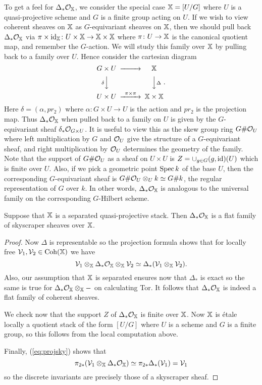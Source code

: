 \documentclass[12pt]{amsart}
\begin{document}
To get a feel for $\Delta_* \mathcal{O}_{\mathbb{X}}$, we consider the special case $\mathbb{X}= [U/G]$ where $U$ is a quasi-projective scheme and $G$ is a finite group acting on $U$. If we wish to view coherent sheaves on $\mathbb{X}$ as $G$-equivariant sheaves on $\mathbb{X}$, then we should pull back $\Delta_* \mathcal{O}_{\mathbb{X}}$ via $\pi \times \operatorname{id}_{\mathbb{X}} \colon U \times \mathbb{X} \to \mathbb{X} \times \mathbb{X}$ where $\pi \colon U \to \mathbb{X}$ is the canonical quotient map, and remember the $G$-action. We will study this family over $\mathbb{X}$ by pulling back to a family over $U$. Hence consider the cartesian diagram
$$\begin{CD}
G \times U @>>> \bX \\
@V{\delta}VV @VV{\Delta}V \\
U \times U @>{\pi \times \pi}>> \bX \times \bX 
\end{CD}.$$
Here $\delta = (\alpha, pr_2)$ where $\alpha \colon G \times U \to U$ is the action and $pr_2$ is the projection map. Thus $\Delta_*\mathcal{O}_{\mathbb{X}}$ when pulled 
back to a family on $U$ is given by the $G$-equivariant sheaf $\delta_* \mathcal{O}_{G \times U}$. It is useful to view this as the skew group ring $G \# \mathcal{O}_U$ where left multiplication by $G$ and $\mathcal{O}_U$ give the structure of a $G$-equivariant sheaf, and right multiplication by $\mathcal{O}_{U}$ determines the geometry of the family.  Note that the support of $G \# \mathcal{O}_U$ as a sheaf on $U \times U$ is $Z = \cup_{g \in G} (g,\operatorname{id})(U)$ which is finite over $U$. Also, if we pick a geometric point $\operatorname{Spec} k$ of the base $U$, then the corresponding $G$-equivariant sheaf is $G \# \mathcal{O}_U \otimes_U k \simeq G \# k$, the regular representation of $G$ over $k$.
In other words, $\Delta_* \mathcal{O}_{\mathbb{X}}$ is analogous to the universal family on the corresponding $G$-Hilbert scheme.


\begin{proposition} \label{prop:universalsky}
Suppose that $\mathbb{X}$ is a separated quasi-projective stack. Then $\Delta_* \mathcal{O}_{\mathbb{X}}$ is a flat family of skyscraper sheaves over $\mathbb{X}$. 
\end{proposition}
\begin{proof}
Now $\Delta$ is representable so the projection formula shows that for locally free $\mathcal{V}_1,\mathcal{V}_2 \in \operatorname{Coh}(\mathbb{X})$ we have
\begin{equation} \mathcal{V}_1 \otimes_{\mathbb{X}} \Delta_* \mathcal{O}_{\mathbb{X}} \otimes_{\mathbb{X}} \mathcal{V}_2 \simeq \Delta_*(\mathcal{V}_1 \otimes_{\mathbb{X}} \mathcal{V}_2) .
\label{eq:projsky}
\end{equation}
Also, our assumption that $\mathbb{X}$ is separated ensures now that $\Delta_*$ is exact so the same is true for $\Delta_* \mathcal{O}_{\mathbb{X}} \otimes_{\mathbb{X}} -$ on calculating Tor. It follows that $\Delta_* \mathcal{O}_{\mathbb{X}}$ is indeed a flat family of coherent sheaves. 

We check now that the support $Z$ of $\Delta_* \mathcal{O}_{\mathbb{X}}$ is finite over $\mathbb{X}$. Now $\mathbb{X}$ is \'etale locally  a quotient stack of the form $[U/G]$ where $U$ is a scheme and $G$ is a finite group, so this follows from the local computation above. 

Finally, (\ref{eq:projsky}) shows that 
$$ \pi_{2*} (\mathcal{V}_1 \otimes_{\mathbb{X}} \Delta_* \mathcal{O}_{\mathbb{X}})
\simeq \pi_{2*} \Delta_*(\mathcal{V}_1) = \mathcal{V}_1
$$
so the discrete invariants are precisely those of a skyscraper sheaf. 
\end{proof}
\end{document}
